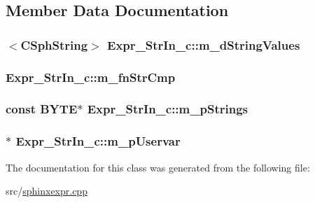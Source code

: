 \subsection{Member Data Documentation}
\hypertarget{classExpr__StrIn__c_a4d8eb7b215f95ac08dcad3295803c082}{
\subsubsection[{m\-\_\-d\-String\-Values}]{$<${\bf C\-Sph\-String}$>$ Expr\-\_\-\-Str\-In\-\_\-c\-::m\-\_\-d\-String\-Values\hspace{0.3cm}{\ttfamily [protected]}}}\label{classExpr__StrIn__c_a4d8eb7b215f95ac08dcad3295803c082}
\hypertarget{classExpr__StrIn__c_ab46cab8d0d6ef8c2f6714d1cdf23092b}{
\subsubsection[{m\-\_\-fn\-Str\-Cmp}]{ Expr\-\_\-\-Str\-In\-\_\-c\-::m\-\_\-fn\-Str\-Cmp\hspace{0.3cm}{\ttfamily [protected]}}}\label{classExpr__StrIn__c_ab46cab8d0d6ef8c2f6714d1cdf23092b}
\hypertarget{classExpr__StrIn__c_a5687083f3ca082c2444be3b5d574a586}{
\subsubsection[{m\-\_\-p\-Strings}]{\setlength{\rightskip}{0pt plus 5cm}const {\bf B\-Y\-T\-E}$\ast$ Expr\-\_\-\-Str\-In\-\_\-c\-::m\-\_\-p\-Strings\hspace{0.3cm}{\ttfamily [protected]}}}\label{classExpr__StrIn__c_a5687083f3ca082c2444be3b5d574a586}
\hypertarget{classExpr__StrIn__c_a955550cd50adb5a5eb15f5aec9329afa}{
\subsubsection[{m\-\_\-p\-Uservar}]{$\ast$ Expr\-\_\-\-Str\-In\-\_\-c\-::m\-\_\-p\-Uservar\hspace{0.3cm}{\ttfamily [protected]}}}\label{classExpr__StrIn__c_a955550cd50adb5a5eb15f5aec9329afa}


The documentation for this class was generated from the following file\-:\begin{DoxyCompactItemize}
\item 
src/\hyperlink{sphinxexpr_8cpp}{sphinxexpr.\-cpp}\end{DoxyCompactItemize}
